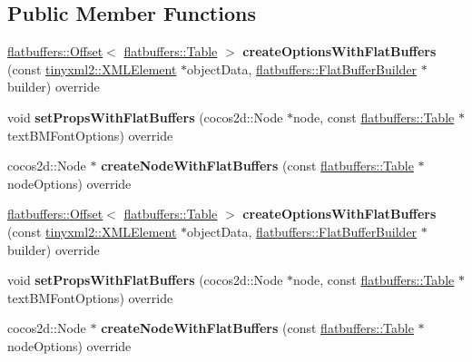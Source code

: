 \subsection*{Public Member Functions}
\begin{DoxyCompactItemize}
\item 
\mbox{\label{classArmatureNodeReader_a79e360e64de73e59390a9a48f0899a36}} 
\hyperlink{structflatbuffers_1_1Offset}{flatbuffers\+::\+Offset}$<$ \hyperlink{classflatbuffers_1_1Table}{flatbuffers\+::\+Table} $>$ {\bfseries create\+Options\+With\+Flat\+Buffers} (const \hyperlink{classtinyxml2_1_1XMLElement}{tinyxml2\+::\+X\+M\+L\+Element} $\ast$object\+Data, \hyperlink{classflatbuffers_1_1FlatBufferBuilder}{flatbuffers\+::\+Flat\+Buffer\+Builder} $\ast$builder) override
\item 
\mbox{\label{classArmatureNodeReader_a7229cb41e89f4257eadab920745ec54b}} 
void {\bfseries set\+Props\+With\+Flat\+Buffers} (cocos2d\+::\+Node $\ast$node, const \hyperlink{classflatbuffers_1_1Table}{flatbuffers\+::\+Table} $\ast$text\+B\+M\+Font\+Options) override
\item 
\mbox{\label{classArmatureNodeReader_a8d185bcd33044c0bbc0c73a6c701c850}} 
cocos2d\+::\+Node $\ast$ {\bfseries create\+Node\+With\+Flat\+Buffers} (const \hyperlink{classflatbuffers_1_1Table}{flatbuffers\+::\+Table} $\ast$node\+Options) override
\item 
\mbox{\label{classArmatureNodeReader_ad4851e197010d655e0d7072c113d676a}} 
\hyperlink{structflatbuffers_1_1Offset}{flatbuffers\+::\+Offset}$<$ \hyperlink{classflatbuffers_1_1Table}{flatbuffers\+::\+Table} $>$ {\bfseries create\+Options\+With\+Flat\+Buffers} (const \hyperlink{classtinyxml2_1_1XMLElement}{tinyxml2\+::\+X\+M\+L\+Element} $\ast$object\+Data, \hyperlink{classflatbuffers_1_1FlatBufferBuilder}{flatbuffers\+::\+Flat\+Buffer\+Builder} $\ast$builder) override
\item 
\mbox{\label{classArmatureNodeReader_a7229cb41e89f4257eadab920745ec54b}} 
void {\bfseries set\+Props\+With\+Flat\+Buffers} (cocos2d\+::\+Node $\ast$node, const \hyperlink{classflatbuffers_1_1Table}{flatbuffers\+::\+Table} $\ast$text\+B\+M\+Font\+Options) override
\item 
\mbox{\label{classArmatureNodeReader_afaa8b38d23f9b61a6c081768b7c8462a}} 
cocos2d\+::\+Node $\ast$ {\bfseries create\+Node\+With\+Flat\+Buffers} (const \hyperlink{classflatbuffers_1_1Table}{flatbuffers\+::\+Table} $\ast$node\+Options) override
\end{DoxyCompactItemize}
